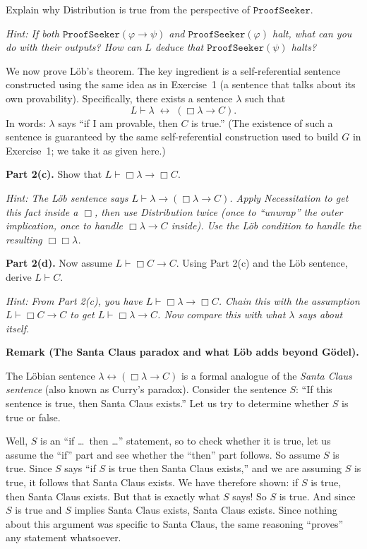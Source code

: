 \documentclass[11pt]{article}
\begin{document}
\begin{exercise}[L\"ob's theorem]
\medskip
\noindent
Explain why Distribution is true from the perspective of $\texttt{ProofSeeker}$.

\medskip
\noindent
\emph{Hint: If both $\texttt{ProofSeeker}(\varphi \to \psi)$ and
$\texttt{ProofSeeker}(\varphi)$ halt, what can you do with their outputs? How can $L$ deduce that $\texttt{ProofSeeker}(\psi)$ halts?}

\bigskip
\noindent
We now prove L\"ob's theorem. The key ingredient is a self-referential sentence
constructed using the same idea as in Exercise~1 (a sentence that talks about its
own provability). Specifically, there exists a sentence $\lambda$ such that
\[
  L \vdash \lambda \;\leftrightarrow\; (\Box\lambda \to C).
\]
In words: $\lambda$ says ``if I am provable, then $C$ is true.'' (The existence of
such a sentence is guaranteed by the same self-referential construction used to build
$G$ in Exercise~1; we take it as given here.)

\medskip
\noindent
\textbf{Part 2(c).} Show that $L \vdash \Box\lambda \to \Box C$.

\medskip
\noindent
\emph{Hint: The L\"ob sentence says $L \vdash \lambda \to (\Box\lambda \to C)$.
Apply Necessitation to get this fact inside a $\Box$, then use Distribution twice
(once to ``unwrap'' the outer implication, once to handle $\Box\lambda \to C$
inside). Use the L\"ob condition to handle the resulting $\Box\Box\lambda$.}

\medskip
\noindent
\textbf{Part 2(d).} Now assume $L \vdash \Box C \to C$. Using Part 2(c) and the
L\"ob sentence, derive $L \vdash C$.

\medskip
\noindent
\emph{Hint: From Part 2(c), you have $L \vdash \Box\lambda \to \Box C$. Chain this
with the assumption $L \vdash \Box C \to C$ to get
$L \vdash \Box\lambda \to C$. Now compare this with what $\lambda$ says about
itself.}

\medskip
\noindent
\medskip
\noindent
\textbf{Remark (The Santa Claus paradox and what L\"ob adds beyond G\"odel).}

\medskip
\noindent
The L\"obian sentence $\lambda \leftrightarrow (\Box\lambda \to C)$ is a formal
analogue of the \emph{Santa Claus sentence} (also known as Curry's paradox). Consider
the sentence $S$: ``If this sentence is true, then Santa Claus exists.'' Let us try
to determine whether $S$ is true or false.

\medskip
\noindent
Well, $S$ is an ``if \ldots\ then \ldots'' statement, so to check whether it is true,
let us assume the ``if'' part and see whether the ``then'' part follows. So assume $S$
is true. Since $S$ says ``if $S$ is true then Santa Claus exists,'' and we are
assuming $S$ is true, it follows that Santa Claus exists. We have therefore shown: if
$S$ is true, then Santa Claus exists. But that is exactly what $S$ says! So $S$ is
true. And since $S$ is true and $S$ implies Santa Claus exists, Santa Claus exists.
Since nothing about this argument was specific to Santa Claus, the same reasoning
``proves'' any statement whatsoever.


\end{exercise}
\end{document}
